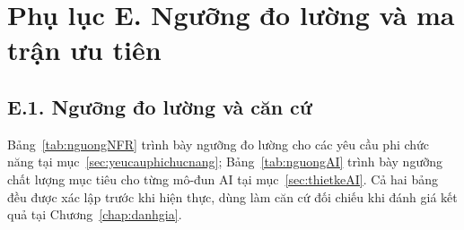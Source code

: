 
\section*{Phụ lục E. Ngưỡng đo lường và ma trận ưu tiên}
\label{apdx:nguong}

\subsection*{E.1. Ngưỡng đo lường và căn cứ}

Bảng~\ref{tab:nguongNFR} trình bày ngưỡng đo lường cho các yêu cầu phi chức
năng tại mục~\ref{sec:yeucauphichucnang}; Bảng~\ref{tab:nguongAI} trình bày
ngưỡng chất lượng mục tiêu cho từng mô-đun AI tại mục~\ref{sec:thietkeAI}.
Cả hai bảng đều được xác lập trước khi hiện thực, dùng làm căn cứ đối chiếu
khi đánh giá kết quả tại Chương~\ref{chap:danhgia}.

